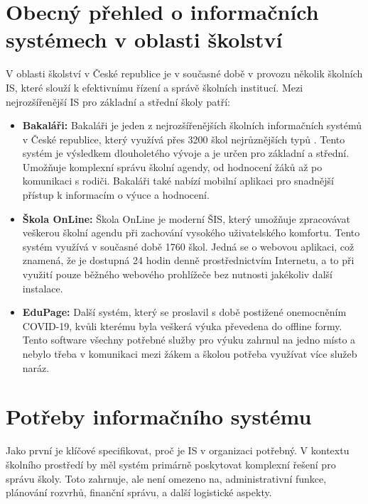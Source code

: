 \documentclass[FM,Proj]{tulthesis}
\begin{document}
\section{Obecný přehled o informačních systémech v oblasti školství}
V oblasti školství v České republice je v současné době v provozu několik školních 
IS, které slouží k efektivnímu řízení a správě školních institucí. 
Mezi nejrozšířenější IS pro základní a střední školy patří:


\begin{samepage}
    \begin{itemize}
        \item \textbf{Bakaláři:} Bakaláři je jeden z nejrozšířenějších školních informačních 
        systémů v České republice, který využívá přes 3200 škol nejrůznějších typů
        \cite{bakalari-statistika}. Tento systém je výsledkem dlouholetého vývoje a je určen
        pro základní a střední. Umožňuje komplexní správu školní agendy, od hodnocení žáků
        až po komunikaci s rodiči. Bakaláři také nabízí mobilní aplikaci pro snadnější 
        přístup k informacím o výuce a hodnocení.

        \item \textbf{Škola OnLine:} Škola OnLine je moderní ŠIS, 
        který umožňuje zpracovávat veškerou školní agendu při zachování vysokého uživatelského 
        komfortu. Tento systém využívá v současné době 1760 škol\cite{skolaonline-statistika}.
        Jedná se o webovou aplikaci, což znamená, že je dostupná 24 hodin denně 
        prostřednictvím Internetu, a to při využití pouze běžného webového prohlížeče bez 
        nutnosti jakékoliv další instalace.

        \item \textbf{EduPage:} Další systém, který se proslavil s době postižené onemocněním 
        COVID-19, kvůli kterému byla veškerá výuka převedena do offline formy. Tento software
        všechny potřebné služby pro výuku zahrnul na jedno místo a nebylo třeba v komunikaci 
        mezi žákem a školou potřeba využívat více služeb naráz.

    \end{itemize}
\end{samepage}

\section{Potřeby informačního systému}
Jako první je klíčové specifikovat, proč je IS 
v organizaci potřebný. V kontextu školního prostředí by měl systém 
primárně poskytovat komplexní řešení pro správu školy. Toto zahrnuje, 
ale není omezeno na, administrativní funkce, plánování rozvrhů, 
finanční správu, a další logistické aspekty.
\end{document}
